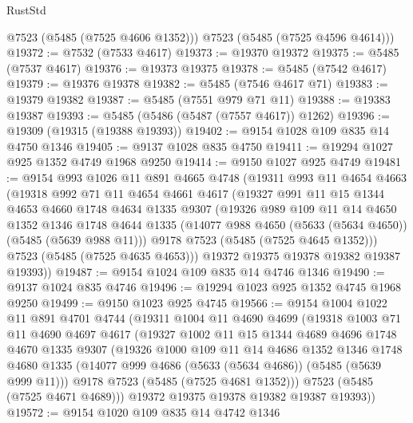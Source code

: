 \begin{lexlean}{RustStd}
\begin{coremodule}
        @7523
        (@5485 (@7525 @4606 @1352)))
      @7523
      (@5485 (@7525 @4596 @4614)))
@19372 := @7532 (@7533 @4617)
@19373 := @19370 @19372
@19375 := @5485 (@7537 @4617)
@19376 := @19373 @19375
@19378 := @5485 (@7542 @4617)
@19379 := @19376 @19378
@19382 := @5485 (@7546 @4617 @71)
@19383 := @19379 @19382
@19387 := @5485 (@7551 @979 @71 @11)
@19388 := @19383 @19387
@19393 := @5485 (@5486 (@5487 (@7557 @4617)) @1262)
@19396 := @19309 (@19315 (@19388 @19393))
@19402 := @9154 @1028 @109 @835 @14 @4750 @1346
@19405 := @9137 @1028 @835 @4750
@19411 := @19294 @1027 @925 @1352 @4749 @1968 @9250
@19414 := @9150 @1027 @925 @4749
@19481 := @9154
    @993
    @1026
    @11
    @891
    @4665
    @4748
    (@19311
      @993
      @11
      @4654
      @4663
      (@19318
        @992
        @71
        @11
        @4654
        @4661
        @4617
        (@19327
          @991
          @11
          @15
          @1344
          @4653
          @4660
          @1748
          @4634
          @1335
          @9307
          (@19326
            @989
            @109
            @11
            @14
            @4650
            @1352
            @1346
            @1748
            @4644
            @1335
            (@14077 @988 @4650 (@5633 (@5634 @4650)) (@5485 (@5639 @988 @11)))
            @9178
            @7523
            (@5485 (@7525 @4645 @1352)))
          @7523
          (@5485 (@7525 @4635 @4653)))
        @19372
        @19375
        @19378
        @19382
        @19387
        @19393))
@19487 := @9154 @1024 @109 @835 @14 @4746 @1346
@19490 := @9137 @1024 @835 @4746
@19496 := @19294 @1023 @925 @1352 @4745 @1968 @9250
@19499 := @9150 @1023 @925 @4745
@19566 := @9154
    @1004
    @1022
    @11
    @891
    @4701
    @4744
    (@19311
      @1004
      @11
      @4690
      @4699
      (@19318
        @1003
        @71
        @11
        @4690
        @4697
        @4617
        (@19327
          @1002
          @11
          @15
          @1344
          @4689
          @4696
          @1748
          @4670
          @1335
          @9307
          (@19326
            @1000
            @109
            @11
            @14
            @4686
            @1352
            @1346
            @1748
            @4680
            @1335
            (@14077 @999 @4686 (@5633 (@5634 @4686)) (@5485 (@5639 @999 @11)))
            @9178
            @7523
            (@5485 (@7525 @4681 @1352)))
          @7523
          (@5485 (@7525 @4671 @4689)))
        @19372
        @19375
        @19378
        @19382
        @19387
        @19393))
@19572 := @9154 @1020 @109 @835 @14 @4742 @1346

\end{coremodule}
\end{lexlean}
